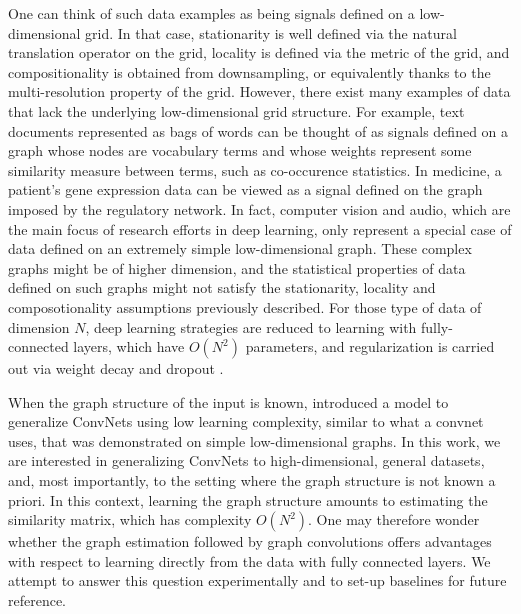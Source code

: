 \documentclass{article} %
\begin{document}
%
%
% 
One can think of such data examples as being signals defined on a low-dimensional grid. In that case, stationarity is well defined via the natural translation 
operator on the grid, locality is defined via the metric of the grid, and compositionality is obtained from downsampling, or equivalently thanks to the multi-resolution property of the grid.
However, there exist many examples of data that lack the underlying low-dimensional grid structure. 
For example, text documents represented as bags of words can be thought of as signals defined on a graph whose nodes are vocabulary terms and whose weights represent some similarity measure between terms, such as co-occurence statistics. In medicine, a patient's gene expression data can be viewed as a signal defined on the graph imposed by the regulatory network. In fact, computer vision and audio, which are the main focus of research efforts in deep learning, only represent a special case of data defined on an extremely simple low-dimensional graph. These complex graphs might be of higher dimension, and the statistical properties of data defined on such graphs might not satisfy the stationarity, locality and composotionality assumptions previously described.
For those type of data of dimension $N$, deep learning strategies are reduced to learning with fully-connected layers, which have $O(N^2)$ parameters, and regularization is carried out via weight decay and dropout \cite{srivastava2014dropout}.

When the graph structure of the input is known, \cite{spectralnet2013} introduced a model to generalize ConvNets using low learning complexity, similar to what a convnet uses, that was demonstrated on simple low-dimensional graphs. In this work, we are interested in generalizing ConvNets to high-dimensional, general datasets,  and, most importantly, to the setting where the graph structure is not known a priori. In this context, learning the graph structure amounts to estimating the similarity matrix, which has complexity $O(N^2)$. One may therefore wonder whether the graph estimation followed by graph convolutions offers advantages with respect to learning directly from the data with fully connected layers. We attempt to answer this question experimentally and to set-up baselines for future reference. 
 
\end{document}
